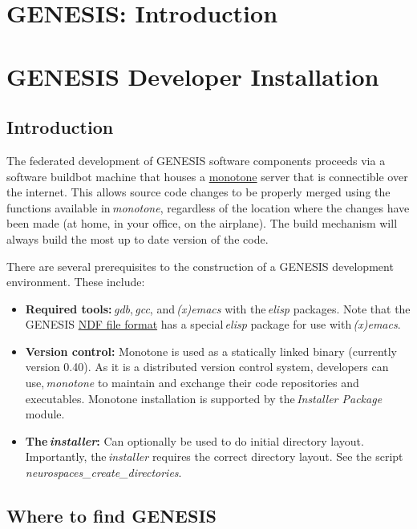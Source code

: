 \documentclass[12pt]{article}
\begin{document}
\section*{GENESIS: Introduction}

\section*{GENESIS Developer Installation}

\subsection*{Introduction}

The federated development of GENESIS software components proceeds via a software buildbot machine that houses a \href{http://monotone.ca/}{monotone} server that is connectible over the internet. This allows source code changes to be properly merged using the functions available in\,{\it monotone}, regardless of the location where the changes have been made (at home, in your office, on the airplane). The build mechanism will always build the most up to date version of the code.

There are several prerequisites to the construction of a GENESIS development environment. These include:

\begin{itemize}

\item {\bf Required tools:}\,{\it gdb},\,{\it gcc}, and\,{\it (x)emacs} with the\,{\it elisp} packages. Note that the GENESIS \href{../ndf-file-format/ndf-file-format.tex}{NDF file format} has a special\,{\it elisp} package for use with\,{\it (x)emacs}.
\item {\bf Version control:} Monotone is used as a statically linked binary (currently version 0.40). As it is a distributed version control system, developers can use,\,{\it monotone} to maintain and exchange their code repositories and executables. Monotone installation is supported by the\,{\it Installer Package} module. 
\item {\bf  The\,{\it installer}:} Can optionally be used to do initial directory layout. Importantly, the\,{\it installer} requires the correct directory layout. See the script {\it neurospaces\_create\_directories}.

\end{itemize}

\subsection*{Where to find GENESIS}
\end{document}
